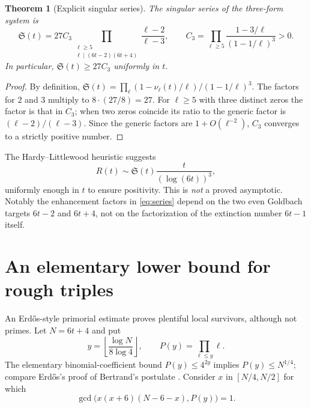\documentclass[11pt,a4paper]{article}
\newtheorem{theorem}{Theorem}[section]
\theoremstyle{definition}
\newcommand{\SSS}{\mathfrak S}
\begin{document}
\begin{theorem}[Explicit singular series]\label{thm:series}
The singular series of the three-form system is
\begin{equation}\label{eq:series}
 \boxed{\SSS(t)=27C_3
  \prod_{\substack{\ell\ge5\\\ell\mid(6t-2)(6t+4)}}
  \frac{\ell-2}{\ell-3},\qquad
  C_3=\prod_{\ell\ge5}\frac{1-3/\ell}{(1-1/\ell)^3}>0.}
\end{equation}
In particular, $\SSS(t)\ge27C_3$ uniformly in $t$.
\end{theorem}
\begin{proof}
By definition,
$\SSS(t)=\prod_\ell(1-\nu_\ell(t)/\ell)/(1-1/\ell)^3$.
The factors for $2$ and $3$ multiply to $8\cdot(27/8)=27$.
For $\ell\ge5$ with three distinct zeros the factor is that in $C_3$;
when two zeros coincide its ratio to the generic factor is
$(\ell-2)/(\ell-3)$. Since the generic factors are
$1+O(\ell^{-2})$, $C_3$ converges to a strictly positive number.
\end{proof}

The Hardy--Littlewood heuristic \cite{HardyLittlewood1923} suggests
\begin{equation}\label{eq:HL}
 R(t)\sim \SSS(t)\frac{t}{(\log(6t))^3},
\end{equation}
uniformly enough in $t$ to ensure positivity. This is \emph{not}
a proved asymptotic.  Notably the enhancement factors in
\eqref{eq:series} depend on the two even Goldbach targets
$6t-2$ and $6t+4$, not on the factorization of the extinction number
$6t-1$ itself.

\section{An elementary lower bound for rough triples}

An Erd\H{o}s-style primorial estimate proves plentiful local survivors,
although not primes. Let $N=6t+4$ and put
\begin{equation}
 y=\left\lfloor\frac{\log N}{8\log4}\right\rfloor,
 \qquad P(y)=\prod_{\ell\le y}\ell.
\end{equation}
The elementary binomial-coefficient bound $P(y)\le4^{2y}$ implies
$P(y)\le N^{1/4}$; compare Erd\H{o}s's proof of Bertrand's postulate
\cite{Erdos1932}.
Consider $x$ in $[N/4,N/2]$ for which
\begin{equation}
 \gcd\bigl(x(x+6)(N-6-x),P(y)\bigr)=1.
\end{equation}
\end{document}
